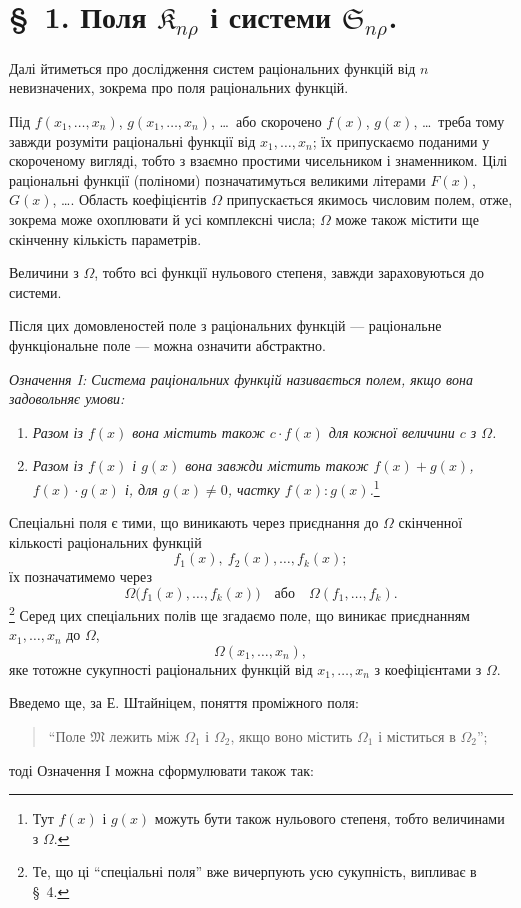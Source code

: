 \documentclass[11pt]{article}
\providecommand{\Kfield}{\mathfrak{K}}
\providecommand{\Ssys}{\mathfrak{S}}
\providecommand{\Mfield}{\mathfrak{M}}
\begin{document}
\section*{\S\ 1. Поля $\Kfield_{n\rho}$ і системи $\Ssys_{n\rho}$.}

Далі йтиметься про дослідження систем раціональних функцій від $n$ невизначених, зокрема про поля раціональних функцій.

Під $f(x_1,\ldots,x_n)$, $g(x_1,\ldots,x_n)$, \ldots\ або скорочено $f(x)$, $g(x)$, \ldots\ треба тому завжди розуміти раціональні функції від $x_1,\ldots,x_n$; їх припускаємо поданими у скороченому вигляді, тобто з взаємно простими чисельником і знаменником. Цілі раціональні функції (поліноми) позначатимуться великими літерами $F(x)$, $G(x)$, \ldots. Область коефіцієнтів $\Omega$ припускається якимось числовим полем, отже, зокрема може охоплювати й усі комплексні числа; $\Omega$ може також містити ще скінченну кількість параметрів.

Величини з $\Omega$, тобто всі функції нульового степеня, завжди зараховуються до системи.

Після цих домовленостей поле з раціональних функцій --- раціональне функціональне поле --- можна означити абстрактно.

\emph{Означення I: Система раціональних функцій називається полем, якщо вона задовольняє умови:}
\begin{enumerate}
\item \emph{Разом із $f(x)$ вона містить також $c\cdot f(x)$ для кожної величини $c$ з $\Omega$.}
\item \emph{Разом із $f(x)$ і $g(x)$ вона завжди містить також $f(x)+g(x)$, $f(x)\cdot g(x)$ і, для $g(x)\ne0$, частку $f(x):g(x)$.}\footnote{Тут $f(x)$ і $g(x)$ можуть бути також нульового степеня, тобто величинами з $\Omega$.}
\end{enumerate}
Спеціальні поля є тими, що виникають через приєднання до $\Omega$ скінченної кількості раціональних функцій
\[
  f_1(x),\ f_2(x),\ldots, f_k(x);
\]
їх позначатимемо через
\[
  \Omega\bigl(f_1(x),\ldots,f_k(x)\bigr)
  \quad\text{або}\quad
  \Omega(f_1,\ldots,f_k).
\]
\footnote{Те, що ці ``спеціальні поля'' вже вичерпують усю сукупність, випливає в \S\ 4.}
Серед цих спеціальних полів ще згадаємо поле, що виникає приєднанням $x_1,\ldots,x_n$ до $\Omega$,
\[
  \Omega(x_1,\ldots,x_n),
\]
яке тотожне сукупності раціональних функцій від $x_1,\ldots,x_n$ з коефіцієнтами з $\Omega$.

Введемо ще, за Е. Штайніцем, поняття проміжного поля:
\begin{quote}
``Поле $\Mfield$ лежить між $\Omega_1$ і $\Omega_2$, якщо воно містить $\Omega_1$ і міститься в $\Omega_2$'';
\end{quote}
тоді Означення I можна сформулювати також так:
\end{document}
